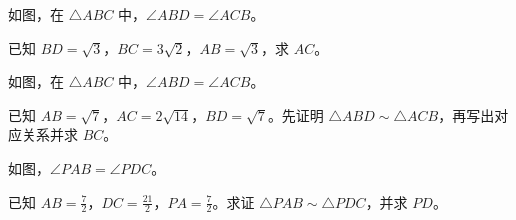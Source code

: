 \documentclass{exam-zh}
\begin{document}

\begin{problem}[points=10]
  \noindent
  \begin{minipage}[t]{\dimexpr\linewidth-60mm-6mm\relax}
    \vspace{0pt}
    如图，在 $\triangle ABC$ 中，$\angle ABD=\angle ACB$。

已知 $BD=\sqrt{3}$，$BC=3\sqrt{2}$，$AB=\sqrt{3}$，求 $AC$。
    
  \end{minipage}\hfill
  \begin{diagramcoltikz}{60mm}{先确认对应边，再判断题中的线段是否属于相似三角形。}
  }
  \end{diagramcoltikz}
  \par\medskip
  \answerarea[48mm]
\end{problem}



\begin{problem}[points=10]
  \noindent
  \begin{minipage}[t]{\dimexpr\linewidth-60mm-6mm\relax}
    \vspace{0pt}
    如图，在 $\triangle ABC$ 中，$\angle ABD=\angle ACB$。

已知 $AB=\sqrt{7}$，$AC=2\sqrt{14}$，$BD=\sqrt{7}$。先证明 $\triangle ABD\sim\triangle ACB$，再写出对应关系并求 $BC$。
    
  \end{minipage}\hfill
  \begin{diagramcoltikz}{60mm}{先确认对应边，再判断题中的线段是否属于相似三角形。}
  }
  \end{diagramcoltikz}
  \par\medskip
  \answerarea[48mm]
\end{problem}



\begin{problem}[points=10]
  \noindent
  \begin{minipage}[t]{\dimexpr\linewidth-60mm-6mm\relax}
    \vspace{0pt}
    如图，$\angle PAB=\angle PDC$。

已知 $AB=\frac{7}{2}$，$DC=\frac{21}{2}$，$PA=\frac{7}{2}$。求证 $\triangle PAB\sim\triangle PDC$，并求 $PD$。
    
  \end{minipage}\hfill
  \begin{diagramcoltikz}{60mm}{沿题设等角的顶点顺序，找出两组三角形的对应边。}
  }
  \end{diagramcoltikz}
  \par\medskip
  \answerarea[48mm]
\end{problem}
\end{document}
